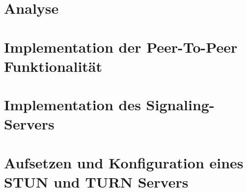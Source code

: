 \section{Analyse}

\section{Implementation der Peer-To-Peer Funktionalität}

\section{Implementation des Signaling-Servers}

\section{Aufsetzen und Konfiguration eines STUN und TURN Servers}